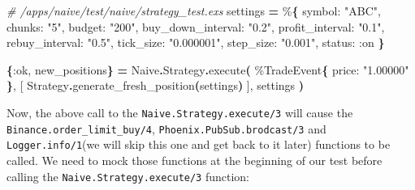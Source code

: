 \documentclass[
  oneside]{book}
\newenvironment{Shaded}{\begin{snugshade}}{\end{snugshade}}
\newcommand{\CommentTok}[1]{\textcolor[rgb]{0.56,0.35,0.01}{\textit{#1}}}
\newcommand{\ConstantTok}[1]{\textcolor[rgb]{0.56,0.35,0.01}{#1}}
\newcommand{\FunctionTok}[1]{\textcolor[rgb]{0.13,0.29,0.53}{\textbf{#1}}}
\newcommand{\NormalTok}[1]{#1}
\newcommand{\OperatorTok}[1]{\textcolor[rgb]{0.81,0.36,0.00}{\textbf{#1}}}
\newcommand{\OtherTok}[1]{\textcolor[rgb]{0.56,0.35,0.01}{#1}}
\newcommand{\StringTok}[1]{\textcolor[rgb]{0.31,0.60,0.02}{#1}}
\newcommand{\VariableTok}[1]{\textcolor[rgb]{0.00,0.00,0.00}{#1}}
\begin{document}
\begin{Shaded}
\begin{Highlighting}[]
\CommentTok{\# /apps/naive/test/naive/strategy\_test.exs}
\NormalTok{  settings }\OperatorTok{=}\NormalTok{ \%}\FunctionTok{\{}
    \VariableTok{symbol:} \StringTok{"ABC"}\NormalTok{,   }
    \VariableTok{chunks:} \StringTok{"5"}\NormalTok{,     }
    \VariableTok{budget:} \StringTok{"200"}\NormalTok{,   }
    \VariableTok{buy\_down\_interval:} \StringTok{"0.2"}\NormalTok{,}
    \VariableTok{profit\_interval:} \StringTok{"0.1"}\NormalTok{,}
    \VariableTok{rebuy\_interval:} \StringTok{"0.5"}\NormalTok{,}
    \VariableTok{tick\_size:} \StringTok{"0.000001"}\NormalTok{,}
    \VariableTok{step\_size:} \StringTok{"0.001"}\NormalTok{,}
    \VariableTok{status:} \VariableTok{:on}
  \FunctionTok{\}}

  \FunctionTok{\{}\VariableTok{:ok}\NormalTok{, new\_positions}\FunctionTok{\}} \OperatorTok{=} \ConstantTok{Naive}\OperatorTok{.}\ConstantTok{Strategy}\OperatorTok{.}\NormalTok{execute}\FunctionTok{(}
\NormalTok{    \%}\ConstantTok{TradeEvent}\FunctionTok{\{}
      \VariableTok{price:} \StringTok{"1.00000"}
    \FunctionTok{\}}\NormalTok{,}
    \OtherTok{[}
      \ConstantTok{Strategy}\OperatorTok{.}\NormalTok{generate\_fresh\_position}\FunctionTok{(}\NormalTok{settings}\FunctionTok{)}
    \OtherTok{]}\NormalTok{,}
\NormalTok{    settings}
  \FunctionTok{)}
\end{Highlighting}
\end{Shaded}

Now, the above call to the \texttt{Naive.Strategy.execute/3} will cause the \texttt{Binance.order\_limit\_buy/4}, \texttt{Phoenix.PubSub.brodcast/3} and \texttt{Logger.info/1}(we will skip this one and get back to it later) functions to be called. We need to mock those functions at the beginning of our test before calling the \texttt{Naive.Strategy.execute/3} function:
\end{document}
